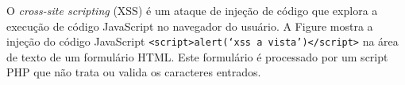 \begin{frame}{}
O {\it cross-site scripting\/} (XSS) é um ataque de injeção de código que
explora a execução de código JavaScript no navegador do usuário.  A
Figure mostra a injeção do código JavaScript
{\tt <script>alert(`xss a vista')</script>} na área de texto de um formulário
HTML. Este formulário é processado por um script PHP que não trata ou
valida os caracteres entrados. 


\end{frame}

